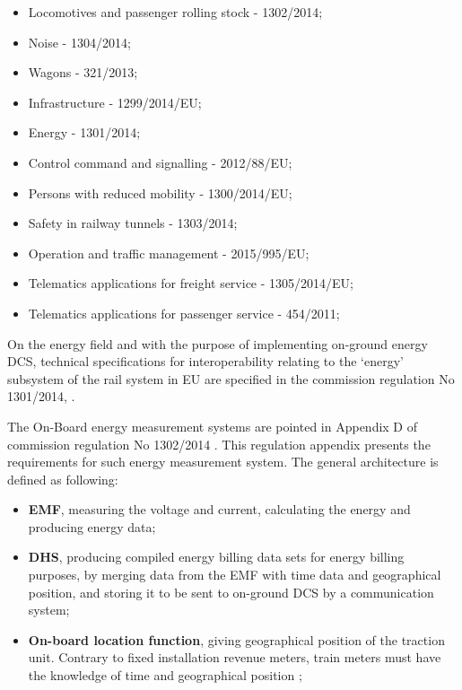 \begin{itemize}
	\setlength\itemsep{-0.5em}
	\item Locomotives and passenger rolling stock - 1302/2014;
	\item Noise - 1304/2014;
	\item Wagons - 321/2013;
	\item Infrastructure - 1299/2014/EU;
	\item Energy - 1301/2014;
	\item Control command and signalling - 2012/88/EU;
	\item Persons with reduced mobility - 1300/2014/EU;
	\item Safety in railway tunnels - 1303/2014;
	\item Operation and traffic management - 2015/995/EU;
	\item Telematics applications for freight service - 1305/2014/EU;
	\item Telematics applications for passenger service - 454/2011;
		
\end{itemize}


On the energy field and with the purpose of implementing on-ground energy \ac{DCS}, technical specifications for interoperability relating to the ‘energy’ subsystem of the rail system in \ac{EU} are specified in the commission regulation No 1301/2014, \cite{eur-lex2014}. 



The On-Board energy measurement systems are pointed in Appendix D of commission regulation No 1302/2014 \cite{eur-lex2014b}. This regulation appendix presents the requirements for such energy measurement system. The general architecture is defined as following:

\begin{itemize}
	\setlength\itemsep{-0.5em}
	\item \textbf{ \ac{EMF}}, measuring the voltage and current, calculating the energy and producing energy data;
	\item \textbf{ \ac{DHS}}, producing compiled energy billing data sets for energy billing purposes, by merging data from the EMF with time data and geographical position, and storing it to be sent to on-ground \ac{DCS} by a communication system;
	\item \textbf{On-board location function}, giving geographical position of the traction unit. Contrary to fixed installation revenue meters, train meters must have the knowledge of time and geographical position \cite{metas2015};
\end{itemize}

